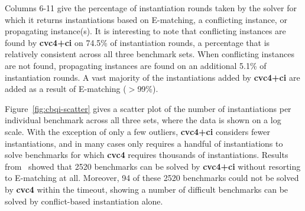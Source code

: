 \documentclass{easychair}
\begin{document}
Columns 6-11 give the percentage of instantiation rounds taken by the solver 
for which it returns instantiations based on E-matching, a conflicting instance,
or propagating instance(s).
It is interesting to note that conflicting instances are found by {\bf cvc4+ci} on
74.5\% of instantiation rounds, a percentage that is relatively consistent across all three benchmark sets.
When conflicting instances are not found, propagating instances are found on an additional 5.1\% of instantiation rounds.
A vast majority of the instantiations added by {\bf cvc4+ci} are added as a result of E-matching ($>$99\%).

Figure~\ref{fig:cbqi-scatter} gives a scatter plot of the number of instantiations per individual benchmark
across all three sets, where the data is shown on a log scale.
With the exception of only a few outliers, {\bf cvc4+ci} considers fewer instantiations,
and in many cases only requires a handful of instantiations to solve benchmarks for which {\bf cvc4}
requires thousands of instantiations.
Results from~\cite{ReynoldsTinelliMoura14} showed that 2520 benchmarks can be solved by {\bf cvc4+ci}
without resorting to E-matching at all.
Moreover, 94 of these 2520 benchmarks could not be solved by {\bf cvc4} within the timeout,
showing a number of difficult benchmarks can be solved by conflict-based instantiation alone.
\end{document}

